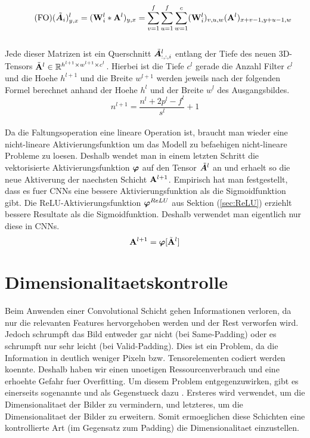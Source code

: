 \begin{equation}\tag{FO}
  (\tilde{\bm{A}}_i)_{y,x}^l = (\mathbf{W}_i^l * \mathbf{A}^l)_{y,x} = \sum_{v=1}^{f} \sum_{u=1}^{f} \sum_{w=1}^c (\mathbf{W}^l_i)_{v,u,w} (\mathbf{A}^l)_{x+v-1,y+u-1,w}
\end{equation}
\\
Jede dieser Matrizen ist ein Querschnitt $\tilde{\bm{A}}^l_{:,:,i}$ entlang der
Tiefe des neuen 3D-Tensors $\tilde{\mathbf{A}}^l \in \mathbb{R}^{h^{l+1} \times w^{l+1} \times c^l}$.
Hierbei ist die Tiefe $c^l$ gerade die Anzahl Filter $c^l$ und die Hoehe
$h^{l+1}$ und die Breite $w^{l+1}$ werden jeweils nach der folgenden Formel
berechnet anhand der Hoehe $h^l$ und der Breite $w^l$ des Ausgangsbildes.
\\
\begin{equation}
  n^{l+1} = \frac{n^l + 2p^l - f^l}{s^l} + 1
\end{equation}
\\
Da die Faltungsoperation eine lineare Operation ist, braucht man wieder eine
nicht-lineare Aktivierungsfunktion um das Modell zu befaehigen nicht-lineare Probleme zu
loesen.
Deshalb wendet man in einem letzten Schritt die vektorisierte Aktivierungsfunktion
$\bm{\varphi}$ auf den Tensor $\tilde{\bm{A}}^l$ an und erhaelt so die
neue Aktiverung der naechsten Schicht $\mathbf{A}^{l+1}$. Empirisch hat man
festgestellt, dass es fuer CNNs eine bessere Aktivierungsfunktion als die
Sigmoidfunktion gibt. Die ReLU-Aktivierungsfunktion $\bm{\varphi}^{ReLU}$ aus Sektion (\ref{sec:ReLU})
erziehlt bessere Resultate als die Sigmoidfunktion. Deshalb verwendet man
eigentlich nur diese in CNNs.
\begin{equation}
  \mathbf{A}^{l+1} = \bm{\varphi}[\tilde{\mathbf{A}}^l]
\end{equation}


\cite{wiki:cnn}
\cite{deeplearning.ai:cnn}
\cite{Goodfellow-et-al-2016}
\cite{Nielsen}

\section{Dimensionalitaetskontrolle}
Beim Anwenden einer Convolutional Schicht gehen Informationen verloren, da nur
die relevanten Features hervorgehoben werden und der Rest verworfen wird. Jedoch
schrumpft das Bild entweder gar nicht (bei Same-Padding) oder es schrumpft nur
sehr leicht (bei Valid-Padding). Dies ist ein Problem, da die Information in
deutlich weniger Pixeln bzw. Tensorelementen codiert werden koennte. Deshalb
haben wir einen unoetigen Ressourcenverbrauch und eine erhoehte Gefahr fuer
Overfitting. Um diesem Problem entgegenzuwirken, gibt es einerseits sogenannte
 und als Gegenstueck dazu
. Ersteres wird verwendet, um die Dimensionalitaet
der Bilder zu vermindern, und letzteres, um die Dimensionalitaet der Bilder zu
erweitern. Somit ermoeglichen diese Schichten eine kontrollierte Art (im Gegensatz zum
Padding) die Dimensionalitaet einzustellen.

